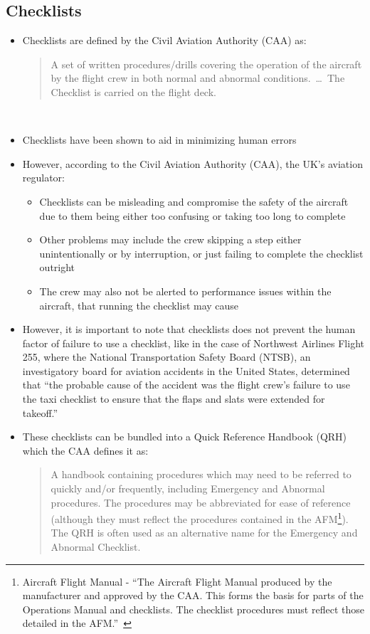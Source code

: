 \documentclass[../dissertation.tex]{subfiles}
\begin{document}
\subsection{Checklists}
\begin{itemize}
  \item Checklists are defined by the Civil Aviation Authority (CAA) as:
    \blockquote{A set of written procedures/drills covering
      the operation of the aircraft by the flight
      crew in both normal and abnormal
      conditions.~\ldots~The Checklist is
      carried on the flight deck.}~\cite{caa:design}


  \item Checklists have been shown to aid in minimizing human errors~\cite{manifesto}
  

  \item However, according to the Civil Aviation Authority (CAA), the UK's aviation regulator:
  \begin{itemize}
    \item Checklists can be misleading and compromise the safety of the aircraft
      due to them being either too confusing or taking too long to complete~\cite{nasa:design}
    \item Other problems may include the crew skipping a step either unintentionally or by interruption,
      or just failing to complete the checklist outright
    \item The crew may also not be alerted to performance issues within the aircraft,
      that running the checklist may cause~\cite{caa:design}
  \end{itemize}
  
  \item However, it is important to note that checklists does not prevent the human
    factor of failure to use a checklist, like in the case of Northwest Airlines
    Flight 255, where the National Transportation Safety Board (NTSB), an investigatory board
    for aviation accidents in the United States, determined that
    \enquote{the probable cause of the accident was the flight crew's failure
    to use the taxi checklist to ensure that the flaps and slats were extended for takeoff.}~\cite{ntsb:NWA255}

    \item These checklists can be bundled into a Quick Reference Handbook (QRH)
      which the CAA defines it as:
      \blockquote{A handbook containing procedures which
        may need to be referred to quickly and/or
        frequently, including Emergency and
        Abnormal procedures. The procedures
        may be abbreviated for ease of reference
        (although they must reflect the procedures
        contained in the AFM\footnote{
          Aircraft Flight Manual - \enquote{The Aircraft Flight Manual produced by the
          manufacturer and approved by the CAA.
          This forms the basis for parts of the
          Operations Manual and checklists. The
          checklist procedures must reflect those
          detailed in the AFM.}~\cite{caa:design}
          }).
        The QRH is often
        used as an alternative name for the
        Emergency and Abnormal Checklist.~\cite{caa:design}}


\end{itemize}
\end{document}
